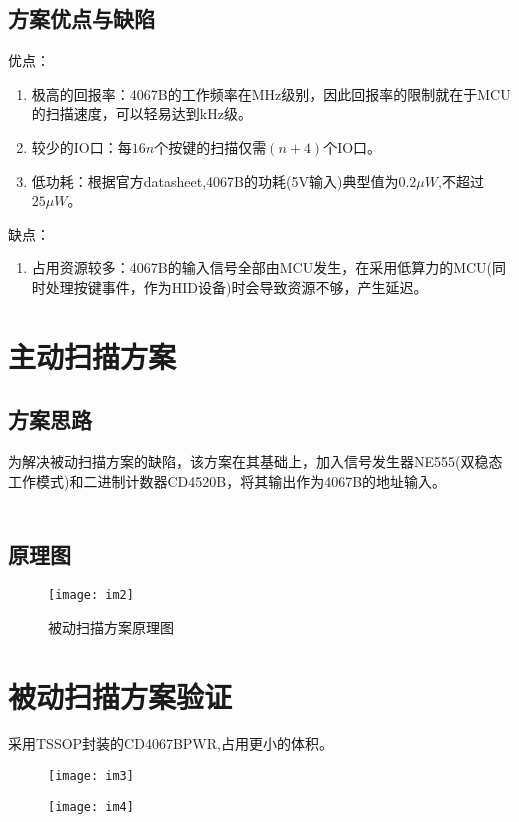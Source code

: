 \documentclass[UTF8]{ctexart}
\begin{document}
	\subsection{方案优点与缺陷}
		优点：
		\begin{enumerate}

			\item 极高的回报率：4067B的工作频率\cite{ref1}在MHz级别\cite{ref1}，因此回报率的限制就在于MCU的扫描速度，可以轻易达到kHz级。

			\item 较少的IO口：每$16n$个按键的扫描仅需$(n+4)$个IO口。

			\item 低功耗：根据官方datasheet,4067B的功耗(5V输入)典型值为$0.2\mu W$,不超过$25\mu W$\cite{ref1}。

		\end{enumerate}
		
		缺点：
		\begin{enumerate}

			\item 占用资源较多：4067B的输入信号全部由MCU发生，在采用低算力的MCU(同时处理按键事件，作为HID设备)时会导致资源不够，产生延迟。

		\end{enumerate}
		
		
	\newpage
	
	\section{主动扫描方案}
	\subsection{方案思路}
		\indent 为解决被动扫描方案的缺陷，该方案在其基础上，加入信号发生器NE555\cite{ref2}(双稳态工作模式)和二进制计数器CD4520B，将其输出作为4067B的地址输入。\\\\
	
	\subsection{原理图}
		\begin{figure}[htbp]
			\centering 
			\texttt{[image: im2]}
			\caption{被动扫描方案原理图}
		\end{figure}
	
	\newpage
	
	\section{被动扫描方案验证}
		\indent 采用TSSOP封装的CD4067BPWR,占用更小的体积。
		\begin{figure}[htbp]
			\centering 
			\texttt{[image: im3]}
		\end{figure}
		\begin{figure}[htbp]
			\centering 
			\texttt{[image: im4]}
		\end{figure}
		
\end{document}
